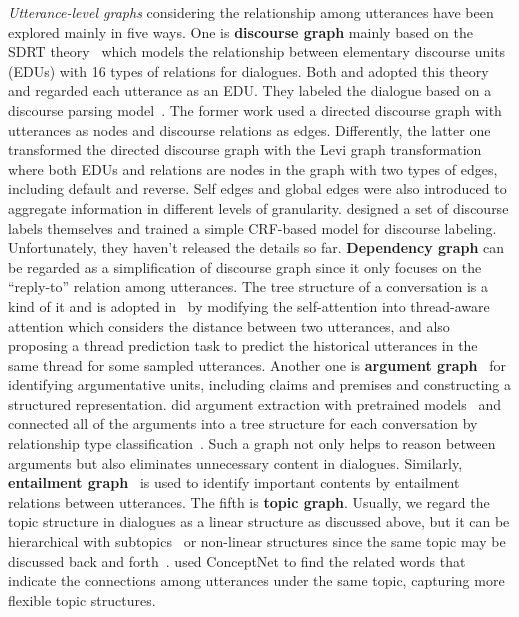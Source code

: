 \textit{Utterance-level graphs} considering the relationship among utterances have been explored mainly in five ways. 
One is \textbf{discourse graph} mainly based on the SDRT theory~\cite{asher2003logics} which models the relationship between elementary discourse units (EDUs) with 16 types of relations for dialogues. Both \citet{chen2021structure} and \citet{feng2020dialogue} adopted this theory and regarded each utterance as an EDU. They labeled the dialogue based on a discourse parsing model~\cite{shi2019deep}. 
The former work used a directed discourse graph with utterances as nodes and discourse relations as edges.
Differently, the latter one transformed the directed discourse graph with the Levi graph transformation where both EDUs and relations are nodes in the graph with two types of edges, including default and reverse.  Self edges and global edges were also introduced to aggregate information in different levels of granularity.
\citet{ganesh2019restructuring} designed a set of discourse labels themselves and trained a simple CRF-based model for discourse labeling. Unfortunately, they haven't released the details so far.
\textbf{Dependency graph} can be regarded as a simplification of discourse graph since it only focuses on the ``reply-to'' relation among utterances.
The tree structure of a conversation is a kind of it and is adopted in~\cite{yang2022tanet} by modifying the self-attention into thread-aware attention which considers the distance between two utterances, and also proposing a thread prediction task to predict the historical utterances in the same thread for some sampled utterances.
Another one is \textbf{argument graph}~\cite{stede2016parallel} for identifying argumentative units, including claims and premises and constructing a structured representation. \citet{fabbri2021convosumm} did argument extraction with pretrained models~\cite{chakrabarty2019ampersand} and connected all of the arguments into a tree structure for each conversation by relationship type classification~\cite{mirko2020towards}. Such a graph not only helps to reason between arguments but also eliminates unnecessary content in dialogues. Similarly, \textbf{entailment graph}~\cite{MehdadCTN13} is used to identify important contents by entailment relations between utterances.
The fifth is \textbf{topic graph}. Usually, we regard the topic structure in dialogues as a linear structure as discussed above, but it can be hierarchical with subtopics~\cite{carletta2005ami, janin2003icsi} or non-linear structures since the same topic may be discussed back and forth~\cite{kim2019dynamic}.
\citet{lei2021finer} used ConceptNet to find the related words that indicate the connections among utterances under the same topic, capturing more flexible topic structures.


